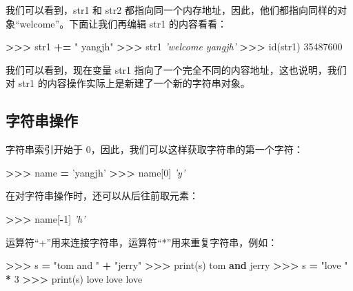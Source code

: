 \documentclass[]{ctexbook}
\newenvironment{Shaded}{\begin{snugshade}}{\end{snugshade}}
\newcommand{\BuiltInTok}[1]{#1}
\newcommand{\CommentTok}[1]{\textcolor[rgb]{0.56,0.35,0.01}{\textit{#1}}}
\newcommand{\DecValTok}[1]{\textcolor[rgb]{0.00,0.00,0.81}{#1}}
\newcommand{\KeywordTok}[1]{\textcolor[rgb]{0.13,0.29,0.53}{\textbf{#1}}}
\newcommand{\NormalTok}[1]{#1}
\newcommand{\OperatorTok}[1]{\textcolor[rgb]{0.81,0.36,0.00}{\textbf{#1}}}
\newcommand{\StringTok}[1]{\textcolor[rgb]{0.31,0.60,0.02}{#1}}
\begin{document}
我们可以看到，str1 和 str2 都指向同一个内存地址，因此，他们都指向同样的对象``welcome''。下面让我们再编辑 str1 的内容看看：

\begin{Shaded}
\begin{Highlighting}[]
\OperatorTok{>>>}\NormalTok{ str1 }\OperatorTok{+=} \StringTok{" yangjh"}
\OperatorTok{>>>}\NormalTok{ str1}
\CommentTok{'welcome yangjh'}
\OperatorTok{>>>} \BuiltInTok{id}\NormalTok{(str1)}
\DecValTok{35487600}
\end{Highlighting}
\end{Shaded}

我们可以看到，现在变量 str1 指向了一个完全不同的内容地址，这也说明，我们对 str1 的内容操作实际上是新建了一个新的字符串对象。

\hypertarget{ux5b57ux7b26ux4e32ux64cdux4f5c}{%
\subsection{字符串操作}\label{ux5b57ux7b26ux4e32ux64cdux4f5c}}

字符串索引开始于 0，因此，我们可以这样获取字符串的第一个字符：

\begin{Shaded}
\begin{Highlighting}[]
\OperatorTok{>>>}\NormalTok{ name }\OperatorTok{=} \StringTok{'yangjh'}
\OperatorTok{>>>}\NormalTok{ name[}\DecValTok{0}\NormalTok{]}
\CommentTok{'y'}
\end{Highlighting}
\end{Shaded}

在对字符串操作时，还可以从后往前取元素：

\begin{Shaded}
\begin{Highlighting}[]
\OperatorTok{>>>}\NormalTok{ name[}\OperatorTok{-}\DecValTok{1}\NormalTok{]}
\CommentTok{'h'}
\end{Highlighting}
\end{Shaded}

运算符``+''用来连接字符串，运算符``*''用来重复字符串，例如：

\begin{Shaded}
\begin{Highlighting}[]
\OperatorTok{>>>}\NormalTok{ s }\OperatorTok{=} \StringTok{"tom and "} \OperatorTok{+} \StringTok{"jerry"}
\OperatorTok{>>>} \BuiltInTok{print}\NormalTok{(s)}
\NormalTok{tom }\KeywordTok{and}\NormalTok{ jerry}
\OperatorTok{>>>}\NormalTok{ s }\OperatorTok{=} \StringTok{"love "} \OperatorTok{*} \DecValTok{3}
\OperatorTok{>>>} \BuiltInTok{print}\NormalTok{(s)}
\NormalTok{love love love}
\end{Highlighting}
\end{Shaded}
\end{document}
